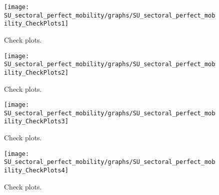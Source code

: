  
\begin{figure}[H]
\centering 
\texttt{[image: SU\_sectoral\_perfect\_mobility/graphs/SU\_sectoral\_perfect\_mobility\_CheckPlots1]}
\caption{Check plots.}\label{Fig:CheckPlots:1}
\end{figure}
 
\begin{figure}[H]
\centering 
\texttt{[image: SU\_sectoral\_perfect\_mobility/graphs/SU\_sectoral\_perfect\_mobility\_CheckPlots2]}
\caption{Check plots.}\label{Fig:CheckPlots:2}
\end{figure}
 
\begin{figure}[H]
\centering 
\texttt{[image: SU\_sectoral\_perfect\_mobility/graphs/SU\_sectoral\_perfect\_mobility\_CheckPlots3]}
\caption{Check plots.}\label{Fig:CheckPlots:3}
\end{figure}
 
\begin{figure}[H]
\centering 
\texttt{[image: SU\_sectoral\_perfect\_mobility/graphs/SU\_sectoral\_perfect\_mobility\_CheckPlots4]}
\caption{Check plots.}\label{Fig:CheckPlots:4}
\end{figure}
 
